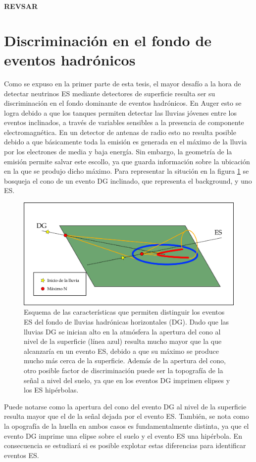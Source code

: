 	\textbf{REVSAR}
	
	
\clearpage
\section{Discriminaci\'on en el fondo de eventos hadr\'onicos}
\label{sc:identificacionRadio}

Como se expuso en la primer parte de esta tesis, el mayor desaf\'io a la hora de detectar neutrinos ES mediante detectores de superficie resulta ser su discriminaci\'on en el fondo dominante de eventos hadr\'onicos.
En Auger esto se logra debido a que los tanques \cher{} permiten detectar las lluvias j\'ovenes entre los eventos inclinados, a trav\'es de variables sensibles a la presencia de componente electromagn\'etica.
En un detector de antenas de radio esto no resulta posible debido a que b\'asicamente toda la emisi\'on es generada en el m\'aximo de la lluvia por los electrones de media y baja energ\'ia.
Sin embargo, la geometr\'ia de la emisi\'on permite salvar este escollo, ya que guarda informaci\'on sobre la ubicaci\'on en la que se produjo dicho m\'aximo.
Para representar la situci\'on en la figura \ref{fig:dg_vs_es_radio} se bosqueja el cono \cher{} de un evento DG inclinado, que representa el background, y uno ES.
%
\begin{figure}[ht!]
	\centering
	\includegraphics[width=\textwidth]{./fig/simulacionRadio/idRadio.png}
	\caption{\label{fig:dg_vs_es_radio}
	Esquema de las caracter\'isticas que permiten distinguir los eventos ES del fondo de lluvias hadr\'onicas horizontales (DG). Dado que las lluvias DG se inician alto en la atm\'osfera la apertura del cono \cher{} al nivel de la superficie (l\'inea azul) resulta mucho mayor que la que alcanzar\'ia en un evento ES, debido a que su m\'aximo se produce mucho m\'as cerca de la superficie.
	Adem\'as de la apertura del cono, otro posible factor de discriminaci\'on puede ser la topograf\'ia de la se\~nal a nivel del suelo, ya que en los eventos DG imprimen elipses y los ES hip\'erbolas.
	}
\end{figure}
%
Puede notarse como la apertura del cono del evento DG al nivel de la superficie resulta mayor que el de la se\~nal dejada por el evento ES.
Tambi\'en, se nota como la opograf\'ia de la huella en ambos casos es fundamentalmente distinta, ya que el evento DG imprime una elipse sobre el suelo y el evento ES una hip\'erbola.
En consecuencia se estudiar\'a si es posible explotar estas diferencias para identificar eventos ES.

